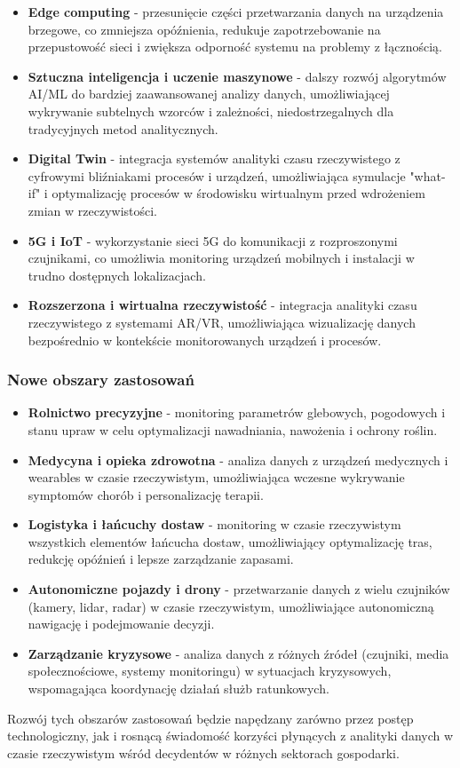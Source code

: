 \begin{itemize}
    \item \textbf{Edge computing} - przesunięcie części przetwarzania danych na urządzenia brzegowe, co zmniejsza opóźnienia, redukuje zapotrzebowanie na przepustowość sieci i zwiększa odporność systemu na problemy z łącznością.
    \item \textbf{Sztuczna inteligencja i uczenie maszynowe} - dalszy rozwój algorytmów AI/ML do bardziej zaawansowanej analizy danych, umożliwiającej wykrywanie subtelnych wzorców i zależności, niedostrzegalnych dla tradycyjnych metod analitycznych.
    \item \textbf{Digital Twin} - integracja systemów analityki czasu rzeczywistego z cyfrowymi bliźniakami procesów i urządzeń, umożliwiająca symulacje "what-if" i optymalizację procesów w środowisku wirtualnym przed wdrożeniem zmian w rzeczywistości.
    \item \textbf{5G i IoT} - wykorzystanie sieci 5G do komunikacji z rozproszonymi czujnikami, co umożliwia monitoring urządzeń mobilnych i instalacji w trudno dostępnych lokalizacjach.
    \item \textbf{Rozszerzona i wirtualna rzeczywistość} - integracja analityki czasu rzeczywistego z systemami AR/VR, umożliwiająca wizualizację danych bezpośrednio w kontekście monitorowanych urządzeń i procesów.
\end{itemize}

\subsubsection{Nowe obszary zastosowań}
\label{subsubsec:nowe_obszary}

\begin{itemize}
    \item \textbf{Rolnictwo precyzyjne} - monitoring parametrów glebowych, pogodowych i stanu upraw w celu optymalizacji nawadniania, nawożenia i ochrony roślin.
    \item \textbf{Medycyna i opieka zdrowotna} - analiza danych z urządzeń medycznych i wearables w czasie rzeczywistym, umożliwiająca wczesne wykrywanie symptomów chorób i personalizację terapii.
    \item \textbf{Logistyka i łańcuchy dostaw} - monitoring w czasie rzeczywistym wszystkich elementów łańcucha dostaw, umożliwiający optymalizację tras, redukcję opóźnień i lepsze zarządzanie zapasami.
    \item \textbf{Autonomiczne pojazdy i drony} - przetwarzanie danych z wielu czujników (kamery, lidar, radar) w czasie rzeczywistym, umożliwiające autonomiczną nawigację i podejmowanie decyzji.
    \item \textbf{Zarządzanie kryzysowe} - analiza danych z różnych źródeł (czujniki, media społecznościowe, systemy monitoringu) w sytuacjach kryzysowych, wspomagająca koordynację działań służb ratunkowych.
\end{itemize}

Rozwój tych obszarów zastosowań będzie napędzany zarówno przez postęp technologiczny, jak i rosnącą świadomość korzyści płynących z analityki danych w czasie rzeczywistym wśród decydentów w różnych sektorach gospodarki. 